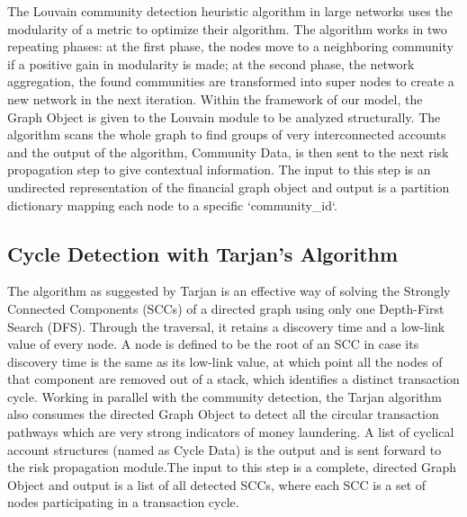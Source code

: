 \documentclass[lettersize,journal]{IEEEtran}
\begin{document}
The Louvain community detection heuristic algorithm in large networks uses the modularity of a metric to optimize their algorithm. The algorithm works in two repeating phases: at the first phase, the nodes move to a neighboring community if a positive gain in modularity is made; at the second phase, the network aggregation, the found communities are transformed into super nodes to create a new network in the next iteration. Within the framework of our model, the Graph Object is given to the Louvain module to be analyzed structurally. The algorithm scans the whole graph to find groups of very interconnected accounts and the output of the algorithm, Community Data, is then sent to the next risk propagation step to give contextual information.
The input to this step is an undirected representation of the financial graph object and
output is a partition dictionary mapping each node to a specific `community\_id`.

\subsection{Cycle Detection with Tarjan's Algorithm}
The algorithm as suggested by Tarjan is an effective way of solving the Strongly Connected Components (SCCs) of a directed graph using only one Depth-First Search (DFS). Through the traversal, it retains a discovery time and a low-link value of every node. A node is defined to be the root of an SCC in case its discovery time is the same as its low-link value, at which point all the nodes of that component are removed out of a stack, which identifies a distinct transaction cycle. Working in parallel with the community detection, the Tarjan algorithm also consumes the directed Graph Object to detect all the circular transaction pathways which are very strong indicators of money laundering. A list of cyclical account structures (named as Cycle Data) is the output and is sent forward to the risk propagation module.The input to this step is a complete, directed Graph Object and output is a list of all detected SCCs, where each SCC is a set of nodes participating in a transaction cycle.
\end{document}
